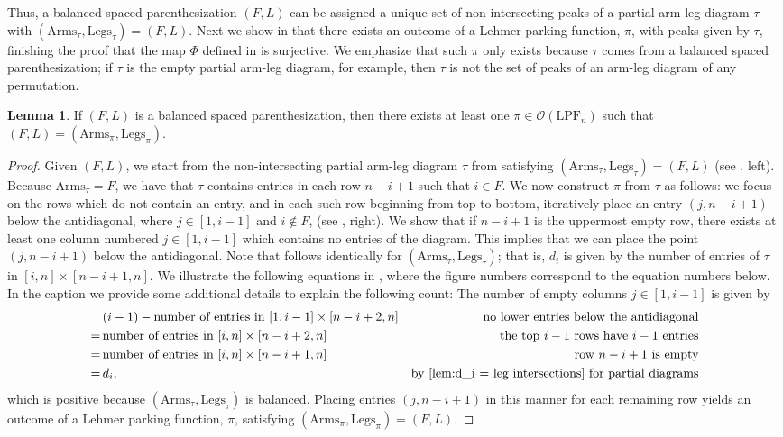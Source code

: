 \documentclass{amsart}
\newcommand{\IT}{\mathrm{LPF}}
\newcommand{\arms}{\mathrm{Arms}}
\newcommand{\legs}{\mathrm{Legs}}
\newcommand{\Out}{\mathcal{O}}
\theoremstyle{definition}
\newtheorem{lemma}[theorem]{Lemma}
\theoremstyle{definition}
\theoremstyle{remark}
\begin{document}
Thus, a balanced spaced parenthesization $(F,L)$ can be assigned a unique set of non-intersecting peaks of a partial arm-leg diagram $\tau$ with $(\arms_\tau,\legs_\tau)=(F,L)$. 
Next we show in  that there exists an outcome of a Lehmer parking function, $\pi$, with peaks given by $\tau$, finishing the proof that the map $\Phi$ defined in  is surjective. We emphasize that such $\pi$ only exists because $\tau$ comes from a balanced spaced parenthesization; if $\tau$ is the empty partial arm-leg diagram, for example, then $\tau$ is not the set of peaks of an arm-leg diagram of any permutation.

\begin{lemma}\label{lem:Phi is surjective}
    If $(F,L)$ is a balanced spaced parenthesization, then there exists at least one 
    $\pi \in \Out(\IT_n)$ such that $(F,L)=(\arms_\pi,\legs_\pi)$.
\end{lemma}
\begin{proof}
    Given $(F,L)$, we start from the non-intersecting partial arm-leg diagram $\tau$ from  satisfying $(\arms_\tau,\legs_\tau)=(F,L)$ (see , left). Because $\arms_\tau=F$, we have that $\tau$ contains entries in each row $n-i+1$ such that $i\in F$.
    We now construct $\pi$ from $\tau$ as follows: we focus on the rows which do not contain an entry, and in each such row 
    beginning from top to bottom, iteratively place an entry $(j,n-i+1)$ below the antidiagonal, where $j\in[1,i-1]$ and $i\notin F$,
    (see , right).
    We show that if $n-i+1$ is the uppermost empty row, 
    there exists at least one column numbered $j\in[1,i-1]$ which contains no entries of the diagram. This implies that we can place the point $(j,n-i+1)$ below the antidiagonal.
    Note that  follows identically for $(\arms_\tau,\legs_\tau)$; that is, $d_i$ is given by the number of entries of $\tau$ in $[i,n]\times[n-i+1,n]$.
    We  illustrate the following equations in , where the figure numbers correspond to the equation numbers below. In the caption we provide some additional details to explain the following count: 
    The number of empty columns $j\in[1,i-1]$ is given by 
    \begin{align}
        \label{eq:2}&(i-1)-\text{number of entries in }[1,i-1]\times[n-i+2,n]&\text{no lower entries below the antidiagonal}\\
        \label{eq:3}=\,&\text{number of entries in }[i,n]\times[n-i+2,n]&\text{the top $i-1$ rows have $i-1$ entries}\\
        \label{eq:4}=\,&\text{number of entries in }[i,n]\times[n-i+1,n]&\text{row $n-i+1$ is empty}\\
        =\,&d_i,&\text{by \Cref{lem:d_i = leg intersections} for partial diagrams}
    \end{align}
    which is positive because $(\arms_\tau,\legs_\tau)$ is balanced. 
    Placing entries $(j,n-i+1)$ in this manner for each remaining row yields an outcome of a Lehmer parking function, $\pi$, satisfying $(\arms_\pi,\legs_\pi)=(F,L)$.
\end{proof}
\end{document}
